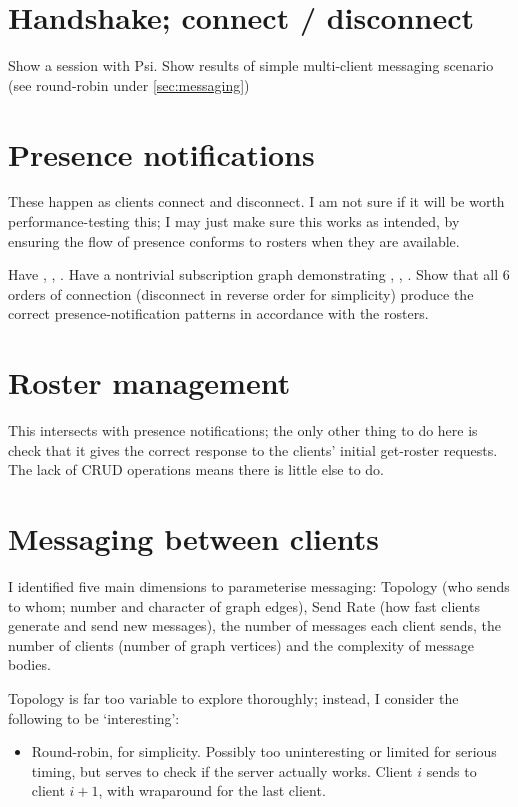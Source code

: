 \documentclass[12pt,a4paper,twoside,openright]{report}
\begin{document}
{\section{Handshake; connect / disconnect}
Show a session with Psi. Show results of simple multi-client messaging scenario (see round-robin under \ref{sec:messaging})

\section{Presence notifications}
These happen as clients connect and disconnect. I am not sure if it will be worth performance-testing this; I may just make sure this works as intended, by ensuring the flow of presence conforms to rosters when they are available.

Have , , . Have a nontrivial subscription graph demonstrating , , . Show that all 6 orders of connection (disconnect in reverse order for simplicity) produce the correct presence-notification patterns in accordance with the rosters.

\section{Roster management}
This intersects with presence notifications; the only other thing to do here is check that it gives the correct response to the clients' initial get-roster requests. The lack of CRUD operations means there is little else to do.

\section{Messaging between clients}
I identified five main dimensions to parameterise messaging: Topology (who sends to whom; number and character of graph edges), Send Rate (how fast clients generate and send new messages), the number of messages each client sends, the number of clients (number of graph vertices) and the complexity of message bodies.

Topology is far too variable to explore thoroughly; instead, I consider the following to be `interesting':

\begin{itemize}
  \item Round-robin, for simplicity. Possibly too uninteresting or limited for serious timing, but serves to check if the server actually works. Client $i$ sends to client $i+1$, with wraparound for the last client.


\end{itemize}}
\end{document}
